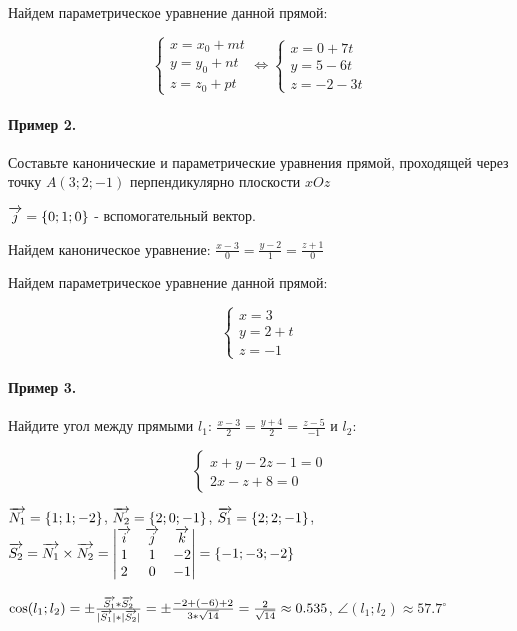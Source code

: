 \documentclass{article}
\def\vec{\ensuremath\overrightarrow}
\begin{document}
\begin{flushleft}
Найдем параметрическое уравнение данной прямой:

\begin{equation}
    \begin{cases}
        x = x_0 + mt \\
        y = y_0 + nt \\
        z = z_0 + pt
    \end{cases}
    \Longleftrightarrow
    \begin{cases}
        x = 0 + 7t \\
        y = 5 - 6t \\
        z = -2 - 3t
    \end{cases}
\end{equation}

\paragraph{Пример 2.} Составьте канонические и параметрические уравнения прямой, проходящей через точку $A(3; 2; -1)$ перпендикулярно плоскости $x O z$

$\vec{j} = \{ 0; 1; 0 \}$ - вспомогательный вектор.

Найдем каноническое уравнение: $\frac{x - 3}{0} = \frac{y - 2}{1} = \frac{z + 1}{0}$

Найдем параметрическое уравнение данной прямой:

\begin{equation}
    \begin{cases}
        x = 3 \\
        y = 2 + t \\
        z = -1
    \end{cases}
\end{equation}

\paragraph{Пример 3.} Найдите угол между прямыми $l_1$: $\frac{x - 3}{2} = \frac{y + 4}{2} = \frac{z - 5}{-1}$ и $l_2$:

\begin{equation}
    \begin{cases}
        x + y - 2z - 1 = 0 \\
        2x - z + 8 = 0
    \end{cases}
\end{equation}

$\vec{N_1} = \{ 1; 1; -2 \}$, $\vec{N_2} = \{ 2; 0; -1 \}$, $\vec{S_1} = \{ 2; 2; -1 \}$, $\vec{S_2} = \vec{N_1} \times \vec{N_2} = \begin{vmatrix}
    \vec{i} & \vec{j} & \vec{k} \\
    1 & 1 & -2 \\
    2 & 0 & -1
\end{vmatrix} = \{ -1; -3; -2 \} $

$\cos(l_1; l_2) = \pm \frac{\vec{S_1} * \vec{S_2}}{|\vec{S_1}| * |\vec{S_2}|} = \pm \frac{-2 + (-6) + 2}{3 * \sqrt{14}} = \frac{2}{\sqrt{14}} \approx 0.535$, $\angle (l_1; l_2) \approx 57.7^\circ$

\end{flushleft}
\end{document}
